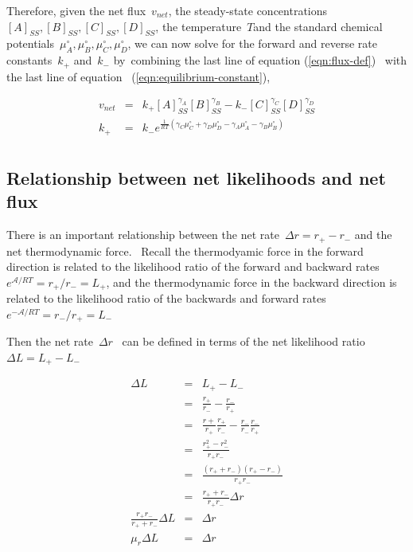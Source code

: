 \documentclass[10pt]{article}
\begin{document}
Therefore, given the net flux~\(v_{net}\), the steady-state
concentrations~\([A]_{SS},[B]_{SS},[C]_{SS},[D]_{SS}\), the temperature~\(T\)and
the standard chemical potentials~\(\mu_A^\circ,\mu_B^\circ,\mu_C^\circ,\mu_D^\circ\), we can now solve
for the forward and reverse rate constants~\(k_+\)
and~\(k_-\) by~combining the last line of equation
({\ref{eqn:flux-def}})~ with the last line of equation~
({\ref{eqn:equilibrium-constant}}),

\begin{eqnarray}
v_{net} & =& k_+[A]_{SS}^{\gamma_A}[B]_{SS}^{\gamma_B} - k_-[C]_{SS}^{\gamma_C}[D]_{SS}^{\gamma_D} \\
k_+ &= & k_-e^{\frac{1}{RT}\left(\gamma_C\mu_C^\circ+ \gamma_D\mu_D^\circ -\gamma_A\mu_A^\circ-\gamma_B\mu_B^\circ\right)} \\
\end{eqnarray}

\subsection{Relationship between net likelihoods and net flux}

There is an important relationship between the net
rate~\( \Delta r=r_+ - r_-\) and the net thermodynamic force.~ Recall the
thermodyamic force in the forward direction is related to the likelihood
ratio of the forward and backward rates~\(e^{\mathcal A/RT} = r_+/r_- = L_+\), and the
thermodynamic force in the backward direction is related to the
likelihood ratio of the backwards and forward rates~\(e^{-\mathcal A/RT} = r_-/r_+ = L_-\)

Then the net rate~\(\Delta r\)~ can be defined in terms of the net
likelihood ratio~\(\Delta L = L_+ - L_-\)

\begin{eqnarray}\label{eqn:net-likelihood}
\Delta L & = &L_+ - L_- \\
& = &\frac{r_+}{r_-} - \frac{r_-}{r_+} \\
& =  &\frac{r+}{r_+}\frac{r_+}{r_-} - \frac{r_-}{r_-}\frac{r_-}{r_+} \\
& =  &\frac{r_+^2 - r_-^2}{r_+r_-} \\
& =  &\frac{(r_+ + r_-)(r_+ - r_-)}{r_+r_-} \\
& =  &\frac{r_+ + r_-}{r_+r_-}\Delta r \\
\frac{r_+r_-}{r_+ + r_-}\Delta L &= &\Delta r \\
\mu_r\Delta L &= &\Delta r \\
\end{eqnarray}
\end{document}
